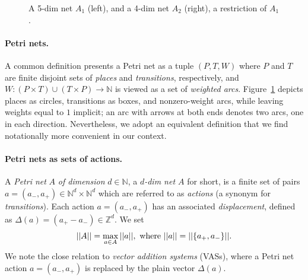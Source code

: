 \documentclass[11pt,a4paper]{amsart}
\newcommand{\nnorm}[1]{||#1||}
\newcommand{\Nat}{\mathbb{N}}
\newcommand{\Zset}{\mathbb{Z}}
\newcommand{\setN}{\Nat}
\newcommand{\setZ}{\Zset}
\theoremstyle{plain}
\theoremstyle{definition}
\theoremstyle{defC}
\theoremstyle{thmC}
\begin{document}
\begin{figure}[t]
\begin{center}
\end{center}
\caption{A 5-dim net $A_1$ (left), and a 4-dim net $A_2$
	(right), a restriction of $A_1$.}
    \label{fig:example}
\end{figure}

\paragraph{Petri nets.}
A common definition presents a Petri net as a tuple $(P,T,W)$ where $P$ and
$T$ are finite disjoint sets of \emph{places} and \emph{transitions},
respectively, and $W\colon (P\times T)\cup(T\times P)\to \setN$
is viewed as a set of \emph{weighted arcs}.
Figure~\ref{fig:example} 
depicts places as circles, transitions as boxes, and nonzero-weight
arcs, while leaving weights equal to $1$ implicit; an arc with arrows
at both ends denotes two arcs, one in each direction. 
Nevertheless, we adopt an equivalent definition that we find notationally more convenient in our context.

\paragraph{Petri nets as sets of actions.}
A \emph{Petri net} $A$ \emph{of dimension} $d\in\setN$, a
\emph{$d$-dim net $A$} for short, is a finite set of pairs
$a=(a_-,a_+) \in \Nat^d \times \Nat^d$ 
which are referred to as 
 \emph{actions} (a synonym for \emph{transitions}).
 Each action $a=(a_-,a_+)$ has an associated \emph{displacement},
defined as $\Delta(a)=(a_+-a_-)\in\setZ^d$. 
We set 
	\[
	\nnorm{A}=\max_{a\in A}\nnorm{a},
	\textnormal{ where }
\nnorm{a}=\nnorm{\{a_+,a_-\}}.
\]
We note the close relation to \emph{vector addition
	systems} (VASs), where a Petri net action
$a=(a_-,a_+)$ is replaced by the plain vector $\Delta(a)$.
\end{document}

